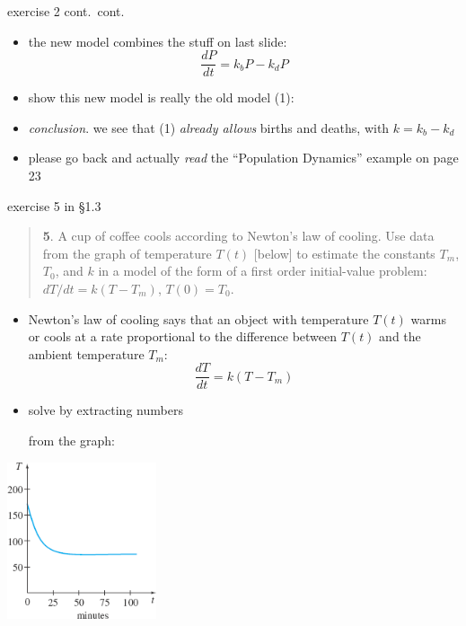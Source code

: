 \documentclass{beamer}
\begin{document}
\begin{frame}{exercise 2 cont.~cont.}

\begin{itemize}
\item the new model combines the stuff on last slide:
    $$\frac{dP}{dt} = k_b P - k_d P$$
\item show this new model is really the old model (1):
\vspace{20mm}

\bigskip
\item \emph{conclusion}.  we see that (1) \emph{already allows} births and deaths, with $k=k_b-k_d$

\bigskip
\item \alert{please go back and actually \emph{read} the ``Population Dynamics'' example on page 23}
\end{itemize}
\end{frame}


\begin{frame}{exercise 5 in \S 1.3}

\scriptsize
\begin{quotation}
\noindent \textbf{5}.  A cup of coffee cools according to Newton's law of cooling.  Use data from the graph of temperature $T(t)$ [below] to estimate the constants $T_m$, $T_0$, and $k$ in a model of the form of a first order initial-value problem: $dT/dt = k(T-T_m)$, $T(0)=T_0$.
\end{quotation}

\normalsize
\medskip

\begin{itemize}
\item Newton's law of cooling says that an object with temperature $T(t)$ warms or cools at a rate proportional to the difference between $T(t)$ and the ambient temperature $T_m$: 
    $$\frac{dT}{dt} = k(T-T_m)$$
\item solve by extracting numbers

from the graph:
\end{itemize}

\vspace{-8mm}
\hfill  \includegraphics[width=0.33\textwidth]{figs/exercise-5-1-3}
\end{frame}
\end{document}
